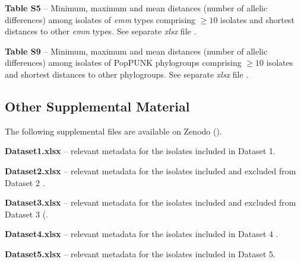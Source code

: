 \newpage
\noindent \textbf{Table S5} – Minimum, maximum and mean distances (number of allelic differences) among isolates of \textit{emm} types comprising $\geq10$ isolates and shortest distances to other \textit{emm} types. See separate \textit{xlsx} file \cite{friaes_supplemental_2023}.

\newpage


\newpage


\newpage
\begin{landscape}
\vspace*{\fill}
    
\vspace*{\fill}
\end{landscape}

\newpage
\noindent \textbf{Table S9} – Minimum, maximum and mean distances (number of allelic differences) among isolates of \ac{PopPUNK} phylogroups comprising  $\geq10$ isolates and shortest distances to other phylogroups. See separate \textit{xlsx} file \cite{friaes_supplemental_2023}.

\newpage
\begin{landscape}
\vspace*{\fill}
    
\vspace*{\fill}
\end{landscape}

\subsection{Other Supplemental Material} \label{ssec:ch4_supplemental_other}

\noindent The following supplemental files are available on Zenodo (\cite{friaes_supplemental_2023}).

\noindent \textbf{Dataset1.xlsx} – relevant metadata for the isolates included in Dataset 1.

\noindent \textbf{Dataset2.xlsx} – relevant metadata for the isolates included and excluded from Dataset 2 \cite{davies_atlas_2019}.

\noindent \textbf{Dataset3.xlsx} – relevant metadata for the isolates included and excluded from Dataset 3 (\cite{coelho_genomic_2019}.

\noindent \textbf{{Dataset4.xlsx}} – relevant metadata for the isolates included in Dataset 4 \cite{lynskey_emergence_2019}.

\noindent \textbf{Dataset5.xlsx} – relevant metadata for the isolates included in Dataset 5.


